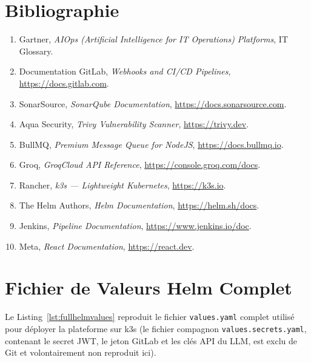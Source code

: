 \documentclass[12pt,a4paper,oneside]{report}
\begin{document}
\chapter*{Bibliographie}
\begin{enumerate}
\item Gartner, \emph{AIOps (Artificial Intelligence for IT Operations) Platforms}, IT Glossary.
\item Documentation GitLab, \emph{Webhooks and CI/CD Pipelines}, \url{https://docs.gitlab.com}.
\item SonarSource, \emph{SonarQube Documentation}, \url{https://docs.sonarsource.com}.
\item Aqua Security, \emph{Trivy Vulnerability Scanner}, \url{https://trivy.dev}.
\item BullMQ, \emph{Premium Message Queue for NodeJS}, \url{https://docs.bullmq.io}.
\item Groq, \emph{GroqCloud API Reference}, \url{https://console.groq.com/docs}.
\item Rancher, \emph{k3s --- Lightweight Kubernetes}, \url{https://k3s.io}.
\item The Helm Authors, \emph{Helm Documentation}, \url{https://helm.sh/docs}.
\item Jenkins, \emph{Pipeline Documentation}, \url{https://www.jenkins.io/doc}.
\item Meta, \emph{React Documentation}, \url{https://react.dev}.
\end{enumerate}

\appendix
\chapter{Fichier de Valeurs Helm Complet}\label{app:helmvalues}
Le Listing~\ref{lst:fullhelmvalues} reproduit le fichier \texttt{values.yaml} complet utilisé pour déployer la plateforme sur k3s (le fichier compagnon \texttt{values.secrets.yaml}, contenant le secret JWT, le jeton GitLab et les clés API du LLM, est exclu de Git et volontairement non reproduit ici).
\end{document}
